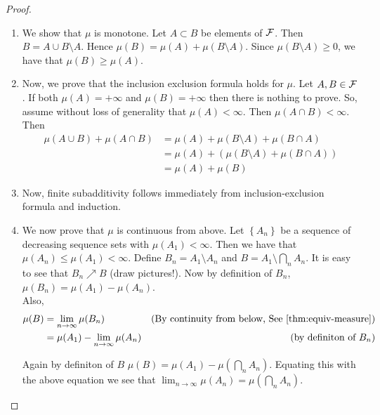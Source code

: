 \begin{proof}
    \begin{enumerate}[label=(\arabic*)]
        \item We show that $\mu$ is monotone. Let $A \subset B$ be elements of ${\cal F}$. Then $B=A\cup B\setminus A$. Hence $\mu (B) = \mu (A) + \mu (B\setminus A)$. Since $\mu (B\setminus A ) \ge 0$, we have that $\mu (B) \ge \mu (A)$. 

        \item Now, we prove that the inclusion exclusion formula holds for $\mu$. Let $A, B\in {\cal F}$. If both $\mu(A) = +\infty$ and $\mu (B) = + \infty$ then there is nothing to prove. So, assume without loss of generality that $\mu (A) < \infty$. Then $\mu (A \cap B) < \infty$.  Then
        \begin{align*}
            \mu (A \cup B) + \mu (A\cap B) &= \mu (A) + \mu (B \setminus A) + \mu (B\cap A)  \\
            &= \mu (A) + (\mu (B \setminus A) + \mu (B\cap A))  \\
            &= \mu (A) + \mu (B)
        \end{align*}

        \item Now, finite subadditivity follows immediately from inclusion-exclusion formula and induction.

        \item We now prove that $\mu$ is continuous from above. Let $\left\{ A_n \right\}$ be a sequence of decreasing sequence sets with $\mu (A_1) < \infty$. Then we have that $\mu (A_n) \le \mu (A_1) < \infty$. Define $B_n = A_1 \setminus A_n$ and $B=A_1 \setminus \bigcap_n A_n$. It is easy to see that $B_n \nearrow B$ (draw pictures!). %
        Now by definition of $B_n$, $\mu (B_n ) = \mu (A_1) - \mu (A_n )$. \\
        Also, 
        \begin{align*}
            \mu (B)    &= \lim_{n \to \infty} \mu (B_n) & \text{(By continuity from below, See } \ref{thm:equiv-measure}) \\ 
                       &= \mu (A_1) - \lim_{n \to \infty} \mu (A_n) & \text{(by definiton of } B_n) \\
        \end{align*}

        Again by definiton of $B$ $\mu (B) = \mu (A_1) - \mu (\bigcap_n A_n )$. Equating this with the above equation we see that $\lim_{n \to \infty} \mu (A_n ) = \mu \left( \bigcap_n A_n \right)$. 


\end{enumerate}
\end{proof}
